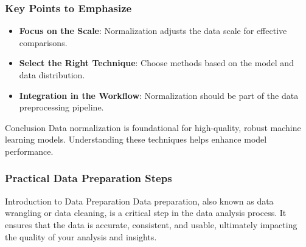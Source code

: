 \documentclass[aspectratio=169]{beamer}
\begin{document}
\begin{frame}
    \frametitle{Key Points to Emphasize}
    \begin{itemize}
        \item \textbf{Focus on the Scale}: Normalization adjusts the data scale for effective comparisons.
        \item \textbf{Select the Right Technique}: Choose methods based on the model and data distribution.
        \item \textbf{Integration in the Workflow}: Normalization should be part of the data preprocessing pipeline.
    \end{itemize}

    \begin{block}{Conclusion}
        Data normalization is foundational for high-quality, robust machine learning models. Understanding these techniques helps enhance model performance.
    \end{block}
\end{frame}

\begin{frame}[fragile]
    \frametitle{Practical Data Preparation Steps}
    \begin{block}{Introduction to Data Preparation}
        Data preparation, also known as data wrangling or data cleaning, is a critical step in the data analysis process. It ensures that the data is accurate, consistent, and usable, ultimately impacting the quality of your analysis and insights.
    \end{block}
\end{frame}
\end{document}

